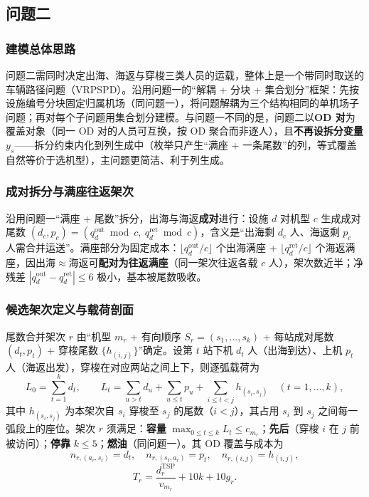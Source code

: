 \documentclass[UTF8,zihao=-4]{ctexart}
\numberwithin{figure}{section}
\numberwithin{table}{section}
\begin{document}
\subsection{问题二}

\subsubsection{建模总体思路}

问题二需同时决定出海、海返与穿梭三类人员的运载，整体上是一个带同时取送的车辆路径问题（VRPSPD）。沿用问题一的“解耦 + 分块 + 集合划分”框架：先按设施编号分块固定归属机场（同问题一），将问题解耦为三个结构相同的单机场子问题；再对每个子问题用集合划分建模。与问题一不同的是，问题二以\textbf{OD 对}为覆盖对象（同一 OD 对的人员可互换，按 OD 聚合而非逐人），且\textbf{不再设拆分变量} $y_s$——拆分约束内化到列生成中（枚举只产生“满座 + 一条尾数”的列，等式覆盖自然等价于选机型），主问题更简洁、利于列生成。

\subsubsection{成对拆分与满座往返架次}

沿用问题一“满座 + 尾数”拆分，出海与海返\textbf{成对}进行：设施 $d$ 对机型 $c$ 生成成对尾数 $(d_c,p_c)=(q_d^{\mathrm{out}}\bmod c,\ q_d^{\mathrm{ret}}\bmod c)$，含义是“出海剩 $d_c$ 人、海返剩 $p_c$ 人需合并运送”。满座部分为固定成本：$\lfloor q_d^{\mathrm{out}}/c\rfloor$ 个出海满座 + $\lfloor q_d^{\mathrm{ret}}/c\rfloor$ 个海返满座，因出海$\approx$海返可\textbf{配对为往返满座}（同一架次往返各载 $c$ 人），架次数近半；净残差 $|q_d^{\mathrm{out}}-q_d^{\mathrm{ret}}|\le6$ 极小，基本被尾数吸收。

\subsubsection{候选架次定义与载荷剖面}

尾数合并架次 $r$ 由“机型 $m_r$ + 有向顺序 $S_r=(s_1,\dots,s_k)$ + 每站成对尾数 $(d_t,p_t)$ + 穿梭尾数 $\{h_{(i,j)}\}$”确定。设第 $t$ 站下机 $d_t$ 人（出海到达）、上机 $p_t$ 人（海返出发），穿梭在对应两站之间上下，则逐弧载荷为
\begin{equation}
  L_0=\sum_{t=1}^{k}d_t,\qquad
  L_t=\sum_{u>t} d_u+\sum_{u\le t} p_u+\sum_{i\le t<j} h_{(s_i,s_j)}\quad(t=1,\dots,k),
\end{equation}
其中 $h_{(s_i,s_j)}$ 为本架次自 $s_i$ 穿梭至 $s_j$ 的尾数（$i<j$），其占用 $s_i$ 到 $s_j$ 之间每一弧段上的座位。架次 $r$ 须满足：\textbf{容量} $\max_{0\le t\le k}L_t\le c_{m_r}$；\textbf{先后}（穿梭 $i$ 在 $j$ 前被访问）；\textbf{停靠} $k\le5$；\textbf{燃油}（同问题一）。其 OD 覆盖与成本为
\begin{equation}
  n_{r,(a_r,s_t)}=d_t,\quad n_{r,(s_t,a_r)}=p_t,\quad n_{r,(i,j)}=h_{(i,j)},
\end{equation}
\begin{equation}
  T_r=\frac{d_r^{\mathrm{TSP}}}{v_{m_r}}+10k+10g_r.
\end{equation}
\end{document}
